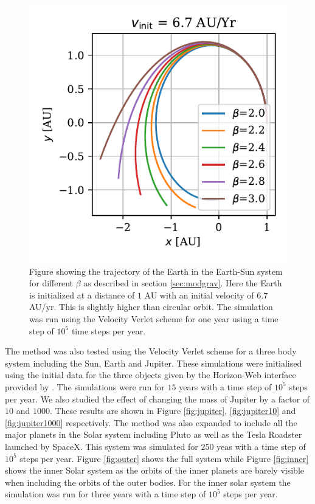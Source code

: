 \documentclass[twocolumn]{aastex62}
\begin{document}
\begin{figure}
\includegraphics[scale=1]{Figures/beta.pdf}
\caption{Figure showing the trajectory of the Earth in the Earth-Sun system for different $\beta$ as described in section \ref{sec:modgrav}. Here the Earth is initialized at a distance of $1$ AU with an initial velocity of $6.7$ AU/yr. This is slightly higher than circular orbit. The simulation was run using the Velocity Verlet scheme for one year using a time step of $10^5$ time steps per year.}
\label{fig:beta}
\end{figure}


The method was also tested using the Velocity Verlet scheme for a three body system including the Sun, Earth and
Jupiter. These simulations were initialised using the initial data for the three
objects given by the Horizon-Web interface provided by \cite{nasa:2018}. The simulations
were run for $15$ years with a time step of $10^5$ steps per year. We also
studied the effect of changing the mass of Jupiter by a factor of $10$ and
$1000$. These results are shown in Figure \ref{fig:jupiter},
\ref{fig:jupiter10} and \ref{fig:jupiter1000} respectively. The method was also
expanded to include all the major planets in the Solar system including Pluto as
well as the Tesla Roadster launched by SpaceX. This system was simulated for
$250$ yeas with a time step of $10^5$ steps per year. Figure \ref{fig:outer}
shows the full system while Figure \ref{fig:inner} shows the inner Solar system
as the orbits of the inner planets are barely visible when including the orbits
of the outer bodies. For the inner solar system the simulation was run for three
years with a time step of $10^5$ steps per year.
\end{document}
